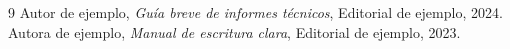 \documentclass[11pt,a4paper]{article}
\begin{document}
  \begin{thebibliography}{9}
     Autor de ejemplo, \textit{Guía breve de informes técnicos}, Editorial de ejemplo, 2024.
     Autora de ejemplo, \textit{Manual de escritura clara}, Editorial de ejemplo, 2023.
  \end{thebibliography}
\end{document}
